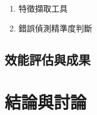 \documentclass[12pt,a4paper]{report}
\begin{document}
\begin{CJK*}{UTF8}{bkai}
\begin{enumerate}

        \item 特徵擷取工具


        \item 錯誤偵測精準度判斷



    \end{enumerate}

    \section{效能評估與成果}


    \chapter{結論與討論}

\end{CJK*}
\end{document}
